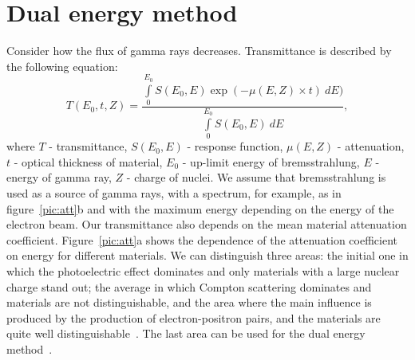 \documentclass[a4paper]{panl}
\begin{document}
\section*{Dual energy method}
Consider how the flux of gamma rays decreases. Transmittance is described by the following equation:
\begin{equation}
\label{eq:trans}
T(E_0, t, Z) = \frac{\int \limits_0^{E_0} S(E_0, E) \exp(-\mu(E,Z)\times t)~dE)}{\int \limits_0^{E_0} S(E_0, E)~dE},
\end{equation}
where $T$ -  transmittance, $S(E_0, E)$ - response function, $\mu(E,Z)$ - attenuation, $t$ -  optical thickness of material, $E_0$ -  up-limit energy of bremsstrahlung, $E$ - energy of gamma ray, $Z$ - charge of nuclei.
We assume that bremsstrahlung is used as a source of gamma rays, with a spectrum, for example, as in figure~\ref{pic:att}b and with the maximum energy depending on the energy of the electron beam. Our transmittance also depends on the mean material attenuation coefficient. Figure~\ref{pic:att}a shows the dependence of the attenuation coefficient on energy for different materials. We can distinguish three areas: the initial one in which the photoelectric effect dominates and only materials with a large nuclear charge stand out; the average in which Compton scattering dominates and materials are not distinguishable, and the area where the main influence is produced by the production of electron-positron pairs, and the materials are quite well distinguishable~\cite{heitler1984quantum, ALLISON2016186, spirin}. The last area can be used for the dual energy method~\cite{spirin}.
\end{document}
